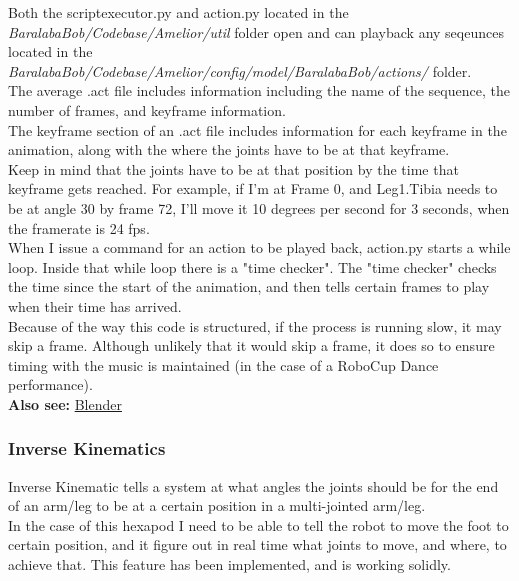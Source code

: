 					Both the scriptexecutor.py and action.py located in the \textit{BaralabaBob/Codebase/Amelior/util} folder open and can playback  any seqeunces located in the \textit{BaralabaBob/Codebase/Amelior/config/model/BaralabaBob/actions/} folder. \\
				
					The average .act file includes information including the name of the sequence, the number of frames, and keyframe information.\\
					
					The keyframe section of an .act file includes information for each keyframe in the animation, along with the where the joints have to be at that keyframe.\\
					
					Keep in mind that the joints have to be at that position by the time that keyframe gets reached. For example, if I'm at Frame 0, and Leg1.Tibia needs to be at angle 30 by frame 72, I'll move it 10 degrees per second for 3 seconds, when the framerate is 24 fps.\\
					
					When I issue a command for an action to be played back, action.py starts a while loop. Inside that while loop there is a "time checker". The "time checker" checks the time since the start of the animation, and then tells certain frames to play when their time has arrived.\\
					
					Because of the way this code is structured, if the process is running slow, it may skip a frame. Although unlikely that it would skip a frame, it does so to ensure timing with the music is maintained (in the case of a RoboCup Dance performance).\\
				
					\textbf{Also see: }\hyperref[Blender]{Blender}
							
				\subsubsection{Inverse Kinematics}
					Inverse Kinematic tells a system at what angles the joints should be for the end of an arm/leg to be at a certain position in a multi-jointed arm/leg.\\
					
					In the case of this hexapod I need to be able to tell the robot to move the foot to certain position, and it figure out in real time what joints to move, and where, to achieve that. This feature has been implemented, and is working solidly.\\
					
